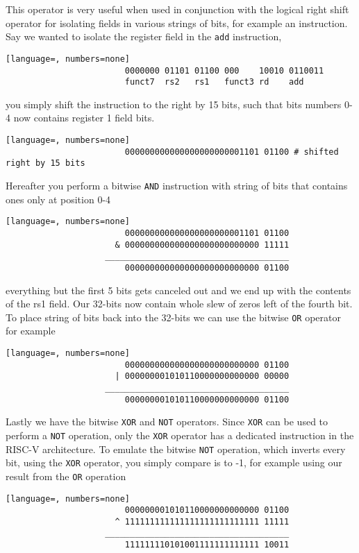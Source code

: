         This operator is very useful when used in conjunction with the logical right shift operator for isolating fields in various strings of bits, for example an instruction. Say we wanted to isolate the register field in the \texttt{add} instruction, 
        \begin{lstlisting}[language=, numbers=none]
                        0000000 01101 01100 000    10010 0110011
                        funct7  rs2   rs1   funct3 rd    add
        \end{lstlisting}
        you simply shift the instruction to the right by 15 bits, such that bits numbers 0-4 now contains register 1 field bits. 
        \begin{lstlisting}[language=, numbers=none]
                        000000000000000000000001101 01100 # shifted right by 15 bits
        \end{lstlisting} 
        Hereafter you perform a bitwise \texttt{AND} instruction with string of bits that contains ones only at position 0-4 
        \begin{lstlisting}[language=, numbers=none]
                        000000000000000000000001101 01100 
                      & 000000000000000000000000000 11111
                    _____________________________________
                        000000000000000000000000000 01100
        \end{lstlisting} 
        everything but the first 5 bits gets canceled out and we end up with the contents of the rs1 field.
        Our 32-bits now contain whole slew of zeros left of the fourth bit. To place string of bits back into the 32-bits we can use the bitwise \texttt{OR} operator for example
        \begin{lstlisting}[language=, numbers=none]
                        000000000000000000000000000 01100
                      | 000000001010110000000000000 00000
                    _____________________________________
                        000000001010110000000000000 01100
        \end{lstlisting}
        Lastly we have the bitwise \texttt{XOR} and \texttt{NOT} operators. Since \texttt{XOR} can be used to perform a \texttt{NOT} operation, only the \texttt{XOR} operator has a dedicated instruction in the RISC-V architecture.
        To emulate the bitwise \texttt{NOT} operation, which inverts every bit, using the \texttt{XOR} operator, you simply compare is to -1, for example using our result from the \texttt{OR} operation
        \begin{lstlisting}[language=, numbers=none]
                        000000001010110000000000000 01100
                      ^ 111111111111111111111111111 11111
                    _____________________________________
                        111111110101001111111111111 10011
        \end{lstlisting}
        
